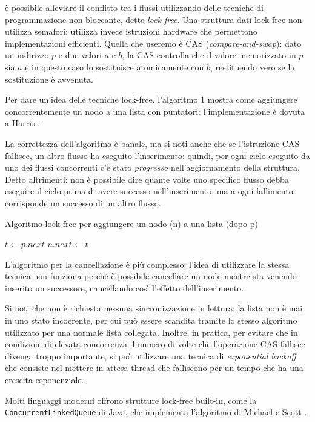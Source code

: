 è possibile alleviare il conflitto tra i flussi utilizzando delle tecniche di programmazione non bloccante, dette \textit{lock-free}. Una struttura dati lock-free non utilizza semafori: utilizza invece istruzioni hardware che permettono implementazioni efficienti. Quella che useremo è CAS (\textit{compare-and-swap}): dato un indirizzo $p$ e due valori $a$ e $b$, la CAS controlla che il valore memorizzato in $p$ sia $a$ e in questo caso lo sostituisce atomicamente con $b$, restituendo vero se la sostituzione è avvenuta.

Per dare un'idea delle tecniche lock-free, l'algoritmo 1 mostra come aggiungere concorrentemente un nodo a una lista con puntatori: l'implementazione è dovuta a Harris \cite{harris}.

La correttezza dell'algoritmo è banale, ma si noti anche che se l'istruzione CAS fallisce, un altro flusso ha eseguito l'inserimento: quindi, per ogni ciclo eseguito da uno dei flussi concorrenti c'è stato \textit{progresso} nell'aggiornamento della struttura. Detto altrimenti: non è possibile dire quante volte uno specifico flusso debba eseguire il ciclo prima di avere successo nell'inserimento, ma a ogni fallimento corrisponde un successo di un altro flusso.
\begin{algorithm}
\caption{Algoritmo lock-free per aggiungere un nodo (n) a una lista (dopo p)}
\begin{algorithmic}
\Do
\State $t \gets p.next$
\State $n.next \gets t$
\end{algorithmic}
\end{algorithm}
L'algoritmo per la cancellazione è più complesso: l'idea di utilizzare la stessa tecnica non funziona perché è possibile cancellare un nodo mentre sta venendo inserito un successore, cancellando così l'effetto dell'inserimento.

Si noti che non è richiesta nessuna sincronizzazione in lettura: la lista non è mai in uno stato incoerente, per cui può essere scandita tramite lo stesso algoritmo utilizzato per una normale lista collegata. Inoltre, in pratica, per evitare che in condizioni di elevata concorrenza il numero di volte che l'operazione CAS fallisce divenga troppo importante, si può utilizzare una tecnica di \textit{exponential backoff} che consiste nel mettere in attesa thread che falliscono per un tempo che ha una crescita esponenziale.

Molti linguaggi moderni offrono strutture lock-free built-in, come la \texttt{ConcurrentLinkedQueue} di Java, che implementa l'algoritmo di Michael e Scott \cite{prisonmike}.
